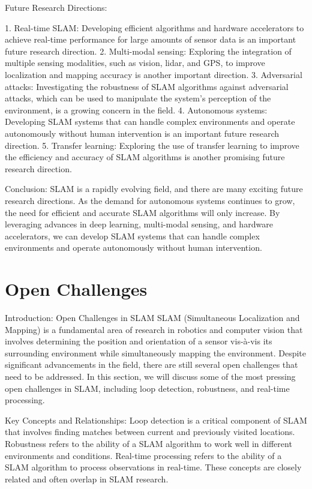 \documentclass[conference]{IEEEtran}
\begin{document}
Future Research Directions:

1. Real-time SLAM: Developing efficient algorithms and hardware accelerators to achieve real-time performance for large amounts of sensor data is an important future research direction.
2. Multi-modal sensing: Exploring the integration of multiple sensing modalities, such as vision, lidar, and GPS, to improve localization and mapping accuracy is another important direction.
3. Adversarial attacks: Investigating the robustness of SLAM algorithms against adversarial attacks, which can be used to manipulate the system's perception of the environment, is a growing concern in the field.
4. Autonomous systems: Developing SLAM systems that can handle complex environments and operate autonomously without human intervention is an important future research direction.
5. Transfer learning: Exploring the use of transfer learning to improve the efficiency and accuracy of SLAM algorithms is another promising future research direction.

Conclusion:
SLAM is a rapidly evolving field, and there are many exciting future research directions. As the demand for autonomous systems continues to grow, the need for efficient and accurate SLAM algorithms will only increase. By leveraging advances in deep learning, multi-modal sensing, and hardware accelerators, we can develop SLAM systems that can handle complex environments and operate autonomously without human intervention.

\section{Open Challenges}
Introduction:
Open Challenges in SLAM
SLAM (Simultaneous Localization and Mapping) is a fundamental area of research in robotics and computer vision that involves determining the position and orientation of a sensor vis-à-vis its surrounding environment while simultaneously mapping the environment. Despite significant advancements in the field, there are still several open challenges that need to be addressed. In this section, we will discuss some of the most pressing open challenges in SLAM, including loop detection, robustness, and real-time processing.

Key Concepts and Relationships:
Loop detection is a critical component of SLAM that involves finding matches between current and previously visited locations. Robustness refers to the ability of a SLAM algorithm to work well in different environments and conditions. Real-time processing refers to the ability of a SLAM algorithm to process observations in real-time. These concepts are closely related and often overlap in SLAM research.
\end{document}

